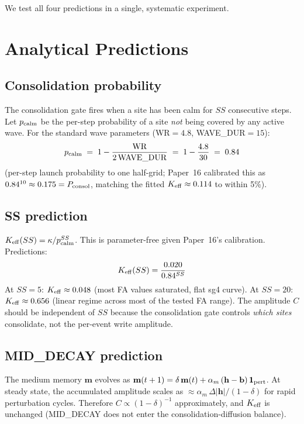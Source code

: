 \documentclass[11pt,a4paper]{article}
\begin{document}
We test all four predictions in a single, systematic experiment.

\section{Analytical Predictions}

\subsection{Consolidation probability}

The consolidation gate fires when a site has been calm for $SS$ consecutive steps.
Let $p_{\rm calm}$ be the per-step probability of a site \emph{not} being covered by
any active wave.  For the standard wave parameters (WR$=4.8$, WAVE\_DUR$=15$):
\[
  p_{\rm calm} \;=\; 1 - \frac{\mathrm{WR}}{2\,\mathrm{WAVE\_DUR}}
  \;=\; 1 - \frac{4.8}{30} \;=\; 0.84
\]
(per-step launch probability to one half-grid; Paper~16 calibrated this as $0.84^{10}
\approx 0.175 = P_{\rm consol}$, matching the fitted $K_{\rm eff} \approx 0.114$ to
within 5\%).

\subsection{SS prediction}

$K_{\rm eff}(SS) = \kappa / p_{\rm calm}^{SS}$.  This is parameter-free given
Paper~16's calibration.  Predictions:
\begin{equation}
  K_{\rm eff}(SS) = \frac{0.020}{0.84^{SS}}
\end{equation}
At $SS=5$: $K_{\rm eff}\approx 0.048$ (most FA values saturated, flat sg4 curve).
At $SS=20$: $K_{\rm eff}\approx 0.656$ (linear regime across most of the tested FA
range).  The amplitude $C$ should be independent of $SS$ because the consolidation
gate controls \emph{which sites} consolidate, not the per-event write amplitude.

\subsection{MID\_DECAY prediction}

The medium memory $\mathbf{m}$ evolves as
$\mathbf{m}(t+1) = \delta\,\mathbf{m}(t) + \alpha_m\,(\mathbf{h}-\mathbf{b})\,\mathbf{1}_{\rm pert}$.
At steady state, the accumulated amplitude scales as $\approx \alpha_m\,\Delta|\mathbf{h}|
/(1-\delta)$ for rapid perturbation cycles.  Therefore $C \propto (1-\delta)^{-1}$
approximately, and $K_{\rm eff}$ is unchanged (MID\_DECAY does not enter the
consolidation-diffusion balance).
\end{document}
